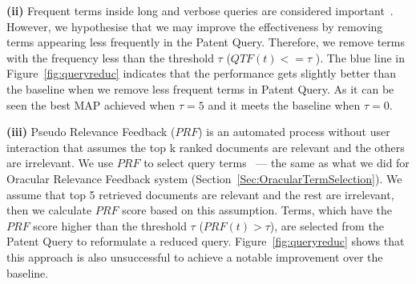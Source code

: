 \vspace*{0.5mm}
\noindent \textbf{(ii)} Frequent terms inside long and verbose queries are considered important~\cite{maxwell2013compact}. However, we hypothesise that we may improve the effectiveness by removing terms appearing less frequently in the Patent Query. Therefore, we remove terms with the frequency less than the threshold $\tau$ ($QTF(t)<=\tau$ ). The blue line in Figure~\ref{fig:queryreduc} indicates that the performance gets slightly better than the baseline when we remove less frequent terms in Patent Query. As it can be seen the best MAP achieved when $\tau=5$ and it meets the baseline when $\tau=0$. 

\vspace*{0.5mm}
\noindent \textbf{(iii)} Pseudo Relevance Feedback ($\mathit{PRF}$) is an automated process without user interaction that assumes the top k ranked documents are relevant and the others are irrelevant. We use $\mathit{PRF}$ to select query terms~\cite{maxwell2013compact} --- the same as what we did for Oracular Relevance Feedback system (Section~\ref{Sec:OracularTermSelection}). We assume that top 5 retrieved documents are relevant and the rest are irrelevant, then we calculate $\mathit{PRF}$ score based on this assumption.  
Terms, which have the $\mathit{PRF}$ score higher than the threshold $\tau$ ($PRF(t)>\tau$), are selected from the Patent Query to reformulate a reduced query. Figure~\ref{fig:queryreduc} shows that this approach is also unsuccessful to achieve a notable improvement over the baseline.


